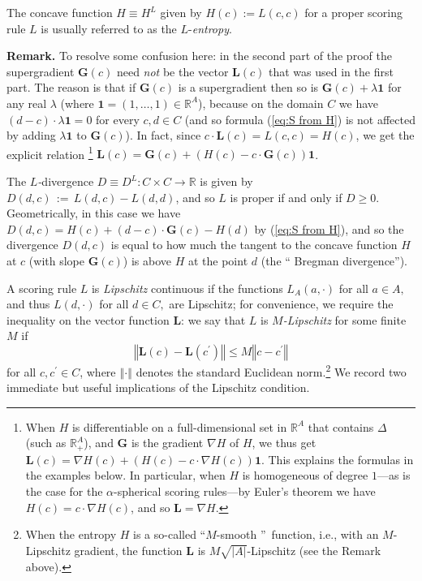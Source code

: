 \documentclass[12pt,a4paper,notitlepage]{article}
\begin{document}
\bigskip

The concave function $H\equiv H^{L}$ given by $H(c):=L(c,c)$ for a proper
scoring rule $L$ is usually referred to as the $L$-\emph{entropy}.

\bigskip

\noindent \textbf{Remark. }To resolve some confusion here: in the second
part of the proof the supergradient $\mathbf{G}(c)$ need \emph{not} be the
vector $\mathbf{L}(c)$ that was used in the first part. The reason is that
if $\mathbf{G}(c)$ is a supergradient then so is $\mathbf{G}(c)+\lambda 
\mathbf{1}$ for any real $\lambda $ (where $\mathbf{1}=(1,\ldots ,1)\in 
\mathbb{R}^{A}$), because on the domain $C$ we have $(d-c)\cdot \lambda 
\mathbf{1}=0$ for every $c,d\in C$ (and so formula (\ref{eq:S from H}) is
not affected by adding $\lambda \mathbf{1}$ to $\mathbf{G}(c)$). In fact,
since $c\cdot \mathbf{L}(c)=L(c,c)=H(c)$, we get the explicit relation%
\footnote{%
When $H$ is differentiable on a full-dimensional set in $\mathbb{R}^{A}$
that contains $\Delta $ (such as $\mathbb{R}_{+}^{A}$), and $\mathbf{G}$ is
the gradient $\nabla H$ of $H$, we thus get $\mathbf{L}(c)=\nabla
H(c)+(H(c)-c\cdot \nabla H(c))\mathbf{1}$. This explains the formulas in the
examples below. In particular, when $H$ is homogeneous of degree $1$---as is
the case for the $\alpha $-spherical scoring rules---by Euler's theorem we
have $H(c)=c\cdot \nabla H(c)$, and so $\mathbf{L}=\nabla H$.} $\mathbf{L}%
(c)=\mathbf{G}(c)+(H(c)-c\cdot \mathbf{G}(c))\mathbf{1}$.

\bigskip

The $L$\emph{-}divergence $D\equiv D^{L}:C\times C\rightarrow \mathbb{R}$ is
given by $D(d,c)\,:=\,L(d,c)-L(d,d)$, and so $L$ is proper if and only if $%
D\geq 0.$ Geometrically, in this case we have $D(d,c)=H(c)+(d-c)\cdot 
\mathbf{G}(c)-H(d)$ by (\ref{eq:S from H}), and so the divergence $D(d,c)$
is equal to how much the tangent to the concave function $H$ at $c$ (with
slope $\mathbf{G}(c)$) is above $H$ at the point $d$ (the \textquotedblleft
Bregman divergence\textquotedblright ).

A scoring rule $L$ is \emph{Lipschitz }continuous if the functions $%
L_{A}(a,\cdot )$ for all $a\in A,$ and thus $L(d,\cdot )$ for all $d\in C,$
are Lipschitz; for convenience, we require the inequality on the vector
function $\mathbf{L}$: we say that $L$ is $M$\emph{-Lipschitz} for some
finite $M$ if%
\begin{equation*}
\left\Vert \mathbf{L}(c)-\mathbf{L}(c^{\prime })\right\Vert \leq M\left\Vert
c-c^{\prime }\right\Vert
\end{equation*}%
for all $c,c^{\prime }\in C$, where $\left\Vert \cdot \right\Vert $ denotes
the standard Euclidean norm.\footnote{%
When the entropy $H$ is a so-called \textquotedblleft $M$-smooth%
\textquotedblright\ function, i.e., with an $M$-Lipschitz gradient, the
function $\mathbf{L}$ is $M\sqrt{|A|}$-Lipschitz (see the Remark above).} We
record two immediate but useful implications of the Lipschitz condition.
\end{document}
